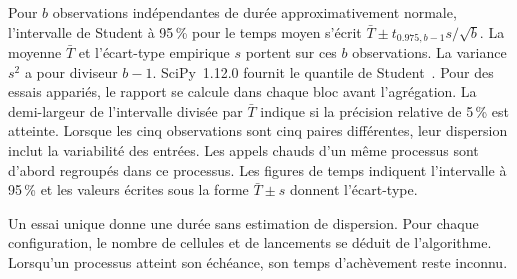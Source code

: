 Pour \(b\) observations indépendantes de durée approximativement normale, l’intervalle de Student à 95\,\% pour le temps moyen s’écrit \(\bar T\pm t_{0.975,b-1}s/\sqrt b\). La moyenne \(\bar T\) et l’écart-type empirique \(s\) portent sur ces \(b\) observations. La variance \(s^2\) a pour diviseur \(b-1\). SciPy~1.12.0 fournit le quantile de Student~\cite{scipy}. Pour des essais appariés, le rapport se calcule dans chaque bloc avant l'agrégation. La demi-largeur de l'intervalle divisée par \(\bar T\) indique si la précision relative de 5\,\% est atteinte. Lorsque les cinq observations sont cinq paires différentes, leur dispersion inclut la variabilité des entrées. Les appels chauds d'un même processus sont d'abord regroupés dans ce processus. Les figures de temps indiquent l’intervalle à 95\,\% et les valeurs écrites sous la forme \(\bar T\pm s\) donnent l’écart-type.

Un essai unique donne une durée sans estimation de dispersion. Pour chaque configuration, le nombre de cellules et de lancements se déduit de l’algorithme. Lorsqu’un processus atteint son échéance, son temps d’achèvement reste inconnu.

